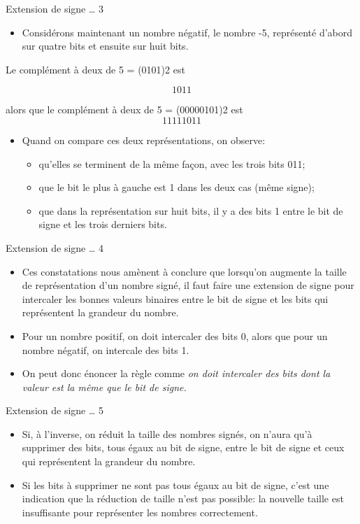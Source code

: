 \documentclass[presentation]{beamer}
\begin{document}
\begin{frame}[label={sec:org78f975f}]{Extension de signe \ldots{} 3}
\begin{itemize}
\item Considérons maintenant un nombre négatif, le nombre -5, représenté d'abord sur quatre bits et ensuite sur huit bits.
\end{itemize}

Le complément à deux de 5 = (0101)2 est

$$ 1011 $$

alors que le complément à deux de 5 = (00000101)2 est $$ 11111011 $$

\begin{itemize}
\item Quand on compare ces deux représentations, on observe: 

\begin{itemize}
\item qu'elles se terminent de la même façon, avec les trois bits 011;
\item que le bit le plus à gauche est 1 dans les deux cas (même signe);
\item que dans la représentation sur huit bits, il y a des bits 1 entre le bit de signe et les trois derniers bits.
\end{itemize}
\end{itemize}
\end{frame}

\begin{frame}[label={sec:org3acaa78}]{Extension de signe \ldots{} 4}
\begin{itemize}
\item Ces constatations nous amènent à conclure que lorsqu'on augmente la taille de représentation d'un nombre signé, il faut faire une \alert{extension de signe} pour intercaler les bonnes valeurs binaires entre le bit de signe et les bits qui représentent la grandeur du nombre.

\item Pour un nombre positif, on doit intercaler des bits 0, alors que pour un nombre négatif, on intercale des bits 1.

\item On peut donc énoncer la règle comme \emph{on doit intercaler des bits dont la valeur est la même que le bit de signe.}
\end{itemize}
\end{frame}

\begin{frame}[label={sec:org4b7dae1}]{Extension de signe \ldots{} 5}
\begin{itemize}
\item Si, à l'inverse, on réduit la taille des nombres signés, on n'aura qu'à supprimer des bits, tous égaux au bit de signe, entre le bit de signe et ceux qui représentent la grandeur du nombre.

\item Si les bits à supprimer ne sont pas tous égaux au bit de signe, c'est une indication que la réduction de taille n'est pas possible: la nouvelle taille est insuffisante pour représenter les nombres correctement.
\end{itemize}
\end{frame}
\end{document}
